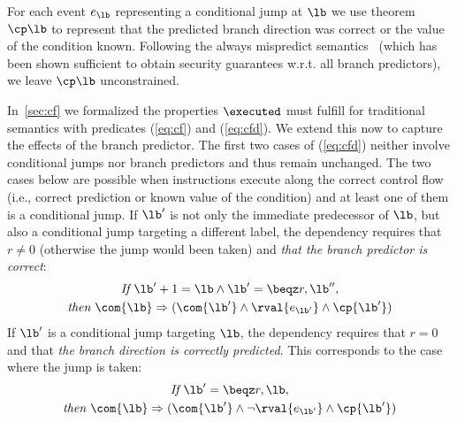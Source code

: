 \documentclass[conference]{IEEEtran}
\begin{document}
For each event $e_\lb$ representing a conditional jump at $\lb$ we use theorem $\cp \lb$ to represent that the predicted branch direction was correct or the value of the condition known. 
Following the always mispredict semantics~\cite{GuarnieriKMRS20} (which has been shown sufficient to obtain security guarantees w.r.t. all branch predictors), we leave $\cp \lb$ unconstrained.

In~\autoref{sec:cf} we formalized the properties $\executed$ must fulfill for traditional semantics with predicates (\ref{eq:cf}) and (\ref{eq:cfd}).
We extend this now to capture the effects of the branch predictor.
The first two cases of (\ref{eq:cfd}) neither involve conditional jumps nor branch predictors and thus remain unchanged.
The two cases below are possible when instructions execute along the correct control flow (i.e., correct prediction or known value of the condition) and at least one of them is a conditional jump.
  If $\lb'$ is not only the immediate predecessor of $\lb$, but also a conditional jump targeting a different label, the dependency requires that $r \neq 0$ (otherwise the jump would been taken) and \emph{that the branch predictor is correct}:
  \begin{gather*}
  \textit{If }\lb'+1 = \lb \land \lb' = \beqz r,\lb'',\\
  \textit{then } \com{\lb} \Rightarrow ({\com{\lb'} \land \rval{e_{\lb'}}} \land \cp{\lb'})
  \end{gather*}
  If $\lb'$ is a conditional jump targeting $\lb$, the dependency requires that $r = 0$ and that \emph{the branch direction is correctly predicted}. This corresponds to the case where the jump is taken:
  \begin{gather*}
  \textit{If }\lb' = \beqz r,\lb,\\
  \textit{then } \com{\lb} \Rightarrow ({\com{\lb'} \land {\neg \rval{e_{\lb'}}}} \land \cp{\lb'})
  \end{gather*}
\end{document}
